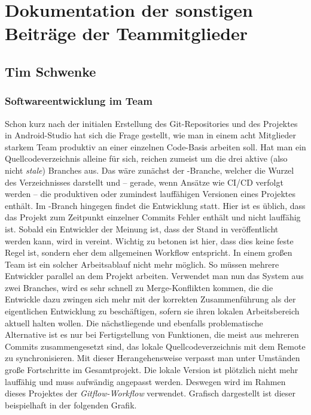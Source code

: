 \section{Dokumentation der sonstigen Beiträge der Teammitglieder}

\subsection{Tim Schwenke}

\subsubsection{Softwareentwicklung im Team}

Schon kurz nach der initialen Erstellung des Git-Repositories und des Projektes in Android-Studio hat sich die Frage gestellt, wie man in einem acht Mitglieder starkem Team produktiv an einer einzelnen Code-Basis arbeiten soll. Hat man ein Quellcodeverzeichnis alleine für sich, reichen zumeist um die drei aktive (also nicht \textit{stale}) Branches aus. Das wäre zunächst der -Branche, welcher die Wurzel des Verzeichnisses darstellt und – gerade, wenn Ansätze wie CI/CD verfolgt werden – die produktiven oder zumindest lauffähigen Versionen eines Projektes enthält. Im -Branch hingegen findet die Entwicklung statt. Hier ist es üblich, dass das Projekt zum Zeitpunkt einzelner Commits Fehler enthält und nicht lauffähig ist. Sobald ein Entwickler der Meinung ist, dass der Stand in  veröffentlicht werden kann, wird  in  vereint. Wichtig zu betonen ist hier, dass dies keine feste Regel ist, sondern eher dem allgemeinen Workflow entspricht. In einem großen Team ist ein solcher Arbeitsablauf nicht mehr möglich. So müssen mehrere Entwickler parallel an dem Projekt arbeiten. Verwendet man nun das System aus zwei Branches, wird es sehr schnell zu Merge-Konflikten kommen, die die Entwickle dazu zwingen sich mehr mit der korrekten Zusammenführung als der eigentlichen Entwicklung zu beschäftigen, sofern sie ihren lokalen Arbeitsbereich aktuell halten wollen. Die nächstliegende und ebenfalls problematische Alternative ist es nur bei Fertigstellung von Funktionen, die meist aus mehreren Commits zusammengesetzt sind, das lokale Quellcodeverzeichnis mit dem Remote zu synchronisieren. Mit dieser Herangehensweise verpasst man unter Umständen große Fortschritte im Gesamtprojekt. Die lokale Version ist plötzlich nicht mehr lauffähig und muss aufwändig angepasst werden. Deswegen wird im Rahmen dieses Projektes der\textit{ Gitflow-Workflow} verwendet. Grafisch dargestellt ist dieser beispielhaft in der folgenden Grafik.

